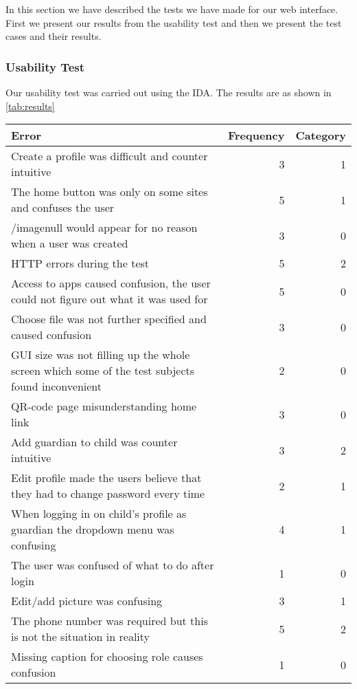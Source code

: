 In this section we have described the tests we have made for our web interface. First we present our results from the usability test and then we present the test cases and their results.

\subsubsection{Usability Test}

Our usability test was carried out using the IDA. The results are as shown in \autoref{tab:results}

\begin{table}[H]
	\scriptsize
	\centering
	\begin{tabular}{|p{7cm}|r|r|}
		\hline
		Error & Frequency & Category \\
		\hline
		\hline
		Create a profile was difficult and counter intuitive & 3 & 1 \\ \hline
		The home button was only on some sites and confuses the user & 5 & 1 \\ \hline
		/imagenull would appear for no reason when a user was created & 3 & 0 \\ \hline
		HTTP errors during the test & 5 & 2 \\ \hline
		Access to apps caused confusion, the user could not figure out what it was used for & 5 & 0 \\ \hline
		Choose file was not further specified and caused confusion & 3 & 0 \\ \hline
		GUI size was not filling up the whole screen which some of the test subjects found inconvenient & 2 & 0 \\ \hline
		QR-code page misunderstanding home link & 3 & 0 \\ \hline
		Add guardian to child was counter intuitive & 3 & 2 \\ \hline
		Edit profile made the users believe that they had to change password every time & 2 & 1 \\ \hline
		When logging in on child's profile as guardian the dropdown menu was confusing & 4 & 1 \\ \hline
		The user was confused of what to do after login & 1 & 0 \\ \hline
		Edit/add picture was confusing & 3 & 1 \\ \hline
		The phone number was required but this is not the situation in reality & 5 & 2 \\ \hline
		Missing caption for choosing role causes confusion & 1 & 0 \\ \hline

\end{tabular}
\end{table}
